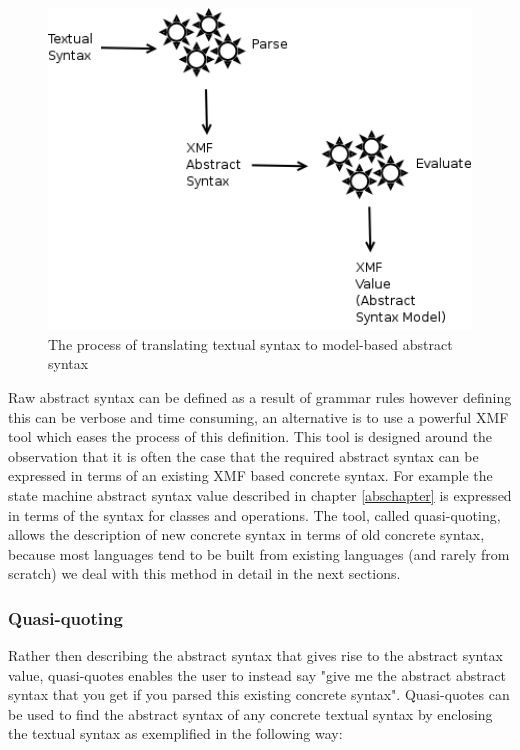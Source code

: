  \begin{figure}[htb]
\begin{center}
\includegraphics[width=12cm]{ConcreteSyntax/figures/process.png}
\caption{The process of translating textual syntax to model-based abstract syntax}
\label{process}
\end{center}
\end{figure}

Raw abstract syntax can be defined as a result of grammar rules however defining this can be verbose and time consuming, an alternative is to use a powerful XMF tool which eases the process of this definition.  This tool is designed around the observation that it is often the case that the required abstract syntax can be expressed in terms of an existing XMF based concrete syntax.  For example the state machine abstract syntax value described in chapter \ref{abschapter} is expressed in terms of the syntax for classes and operations.  The tool, called quasi-quoting, allows the description of new concrete syntax in terms of old concrete syntax, because most languages tend to be built from existing languages (and rarely from scratch) we deal with this method in detail in the next sections.

\subsubsection{Quasi-quoting}

Rather then describing the abstract syntax that gives rise to the abstract syntax value, quasi-quotes enables the user to instead say "give me the abstract abstract syntax that you get if you parsed this existing concrete syntax".  Quasi-quotes can be used to find the abstract syntax of any concrete textual syntax by enclosing the textual syntax as exemplified in the following way:

